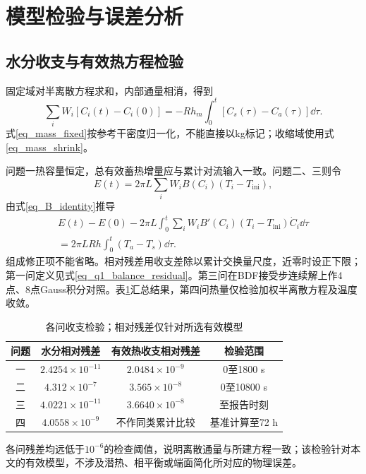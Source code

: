 \section{模型检验与误差分析}\label{sec_validation}
\subsection{水分收支与有效热方程检验}
固定域对半离散方程求和，内部通量相消，得到
\begin{equation}\label{eq_mass_fixed}
\sum_iW_i[C_i(t)-C_i(0)]
=-Rh_m\int_0^t[C_s(\tau)-C_a(\tau)]\dd\tau.
\end{equation}
式\eqref{eq_mass_fixed}按参考干密度归一化，不能直接以kg标记；收缩域使用式\eqref{eq_mass_shrink}。

问题一热容量恒定，总有效蓄热增量应与累计对流输入一致。问题二、三则令
\[
E(t)=2\pi L\sum_iW_iB(C_i)(T_i-T_{\mathrm{ini}}),
\]
由式\eqref{eq_B_identity}推导
\begin{equation}\label{eq_heat_check}
\begin{gathered}
E(t)-E(0)-2\pi L\int_0^t\sum_iW_iB'(C_i)(T_i-T_{\mathrm{ini}})\dot C_i\dd\tau\\
=2\pi LRh\int_0^t(T_a-T_s)\dd\tau.
\end{gathered}
\end{equation}
组成修正项不能省略。相对残差用收支差除以累计交换量尺度，近零时设正下限；第一问定义见式\eqref{eq_q1_balance_residual}。第三问在BDF接受步连续解上作4点、8点Gauss积分对照。表\ref{tab_balance}汇总结果，第四问热量仅检验加权半离散方程及温度收敛。
\begin{table}[htbp]\centering\small
\caption{各问收支检验；相对残差仅针对所选有效模型}\label{tab_balance}
\begin{tabular}{cccc}\toprule
问题 & 水分相对残差 & 有效热收支相对残差 & 检验范围\\\midrule
一 & $2.4254\times10^{-11}$ & $2.0484\times10^{-9}$ & 0至1800 s\\
二 & $4.312\times10^{-7}$ & $3.565\times10^{-8}$ & 0至10800 s\\
三 & $4.0221\times10^{-11}$ & $3.6640\times10^{-8}$ & 至报告时刻\\
四 & $4.0558\times10^{-9}$ & 不作同类累计比较 & 基准计算至72 h\\\bottomrule
\end{tabular}
\end{table}
各问残差均远低于$10^{-6}$的检查阈值，说明离散通量与所建方程一致；该检验针对本文的有效模型，不涉及潜热、相平衡或端面简化所对应的物理误差。

